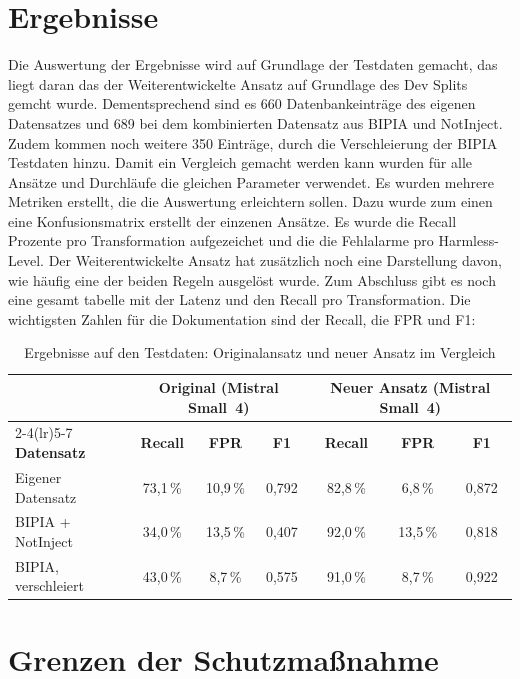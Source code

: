 \section{Ergebnisse}\label{sec:results}

Die Auswertung der Ergebnisse wird auf Grundlage der Testdaten gemacht, das liegt daran das der Weiterentwickelte Ansatz auf Grundlage des Dev Splits gemcht
wurde. Dementsprechend sind es 660 Datenbankeinträge des eigenen Datensatzes und 689 bei dem kombinierten Datensatz aus BIPIA und NotInject. Zudem kommen noch weitere
350 Einträge, durch die Verschleierung der BIPIA Testdaten hinzu. Damit ein Vergleich gemacht werden kann wurden für alle Ansätze und Durchläufe die gleichen Parameter verwendet.
Es wurden mehrere Metriken erstellt, die die Auswertung erleichtern sollen. Dazu wurde zum einen eine Konfusionsmatrix erstellt der einzenen Ansätze. 
Es wurde die Recall Prozente pro Transformation aufgezeichet und die die Fehlalarme pro Harmless-Level. Der Weiterentwickelte Ansatz hat zusätzlich noch eine 
Darstellung davon, wie häufig eine der beiden Regeln ausgelöst wurde. 
Zum Abschluss gibt es noch eine gesamt tabelle mit der Latenz und den Recall pro Transformation. Die wichtigsten Zahlen für die Dokumentation sind der Recall, die
FPR und F1: \\

\begin{table}[htbp]
\centering
\begin{tabular}{l ccc ccc}
\toprule
 & \multicolumn{3}{c}{\textbf{Original (Mistral Small~4)}} & \multicolumn{3}{c}{\textbf{Neuer Ansatz (Mistral Small~4)}} \\
\cmidrule(lr){2-4}\cmidrule(lr){5-7}
\textbf{Datensatz} & \textbf{Recall} & \textbf{FPR} & \textbf{F1} & \textbf{Recall} & \textbf{FPR} & \textbf{F1} \\
\midrule
Eigener Datensatz & 73{,}1\,\% & 10{,}9\,\% & 0{,}792 & 82{,}8\,\% & 6{,}8\,\% & 0{,}872 \\
BIPIA + NotInject & 34{,}0\,\% & 13{,}5\,\% & 0{,}407 & 92{,}0\,\% & 13{,}5\,\% & 0{,}818 \\
BIPIA, verschleiert & 43{,}0\,\% & 8{,}7\,\% & 0{,}575 & 91{,}0\,\% & 8{,}7\,\% & 0{,}922 \\
\bottomrule
\end{tabular}
\caption{Ergebnisse auf den Testdaten: Originalansatz und neuer Ansatz im Vergleich}
\label{tab:ergebnisse}
\end{table}

\section{Grenzen der Schutzmaßnahme}

